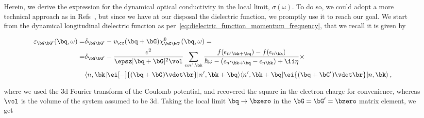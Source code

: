 Herein, we derive the expression for the dynamical optical conductivity in the local limit, $\sigma(\omega)$.
To do so, we could adopt a more technical approach as in Refs~\cite{Bruus_Flensberg_2004,Mahan}, but since we have at our disposal the dielectric function, we promptly use it to reach our goal.
We start from the dynamical longitudinal dielectric function as per~\eqref{eq:dielectric_function_momentum_frequency}, that we recall it is given by

\begin{equation}
    \begin{split}
        \varepsilon_{\bG\bG'}(\bq,\omega) =& \delta_{\bG\bG'}-v_{\cc }(\bq+\bG)\chi_{\bG\bG'}^{0}(\bq,\omega)=\\
                                          =& \delta_{\bG\bG'}-\frac{e^{2}}{\epsz|\bq+\bG|^{2}\vol}\sum_{nn',\bk}\frac{f(\epsilon_{n' \bk+\bq})-f(\epsilon_{n \bk})}{\hbar \omega - (\epsilon_{n' \bk+\bq}-\epsilon_{n \bk})+\ii \eta} \times \\
                                           & \langle n,\bk| \ei[-]{(\bq+\bG)\vdot\br} |n',\bk+\bq\rangle\langle n',\bk+\bq|\ei{(\bq+\bG')\vdot\br}|n,\bk\rangle\,,
    \end{split}
\end{equation}

\noindent where we used the \gls{3d} Fourier transform of the Coulomb potential, and recovered the square in the electron charge for convenience, whereas $\vol$ is the volume of the system assumed to be \gls{3d}\@.
Taking the local limit $\bq\to\bzero$ in the $\bG=\bG'=\bzero$ matrix element, we get


